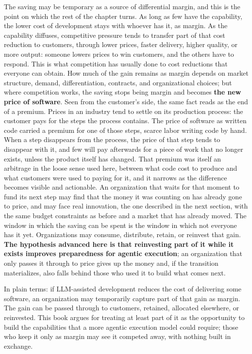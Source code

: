 \documentclass[10pt,oneside,openany]{book}
\newcommand{\keyidea}[1]{%
  \vspace{3pt}
  \noindent\fbox{\begin{minipage}{0.94\linewidth}\small\raggedright\textbf{Key idea.} #1\end{minipage}}
  \vspace{3pt}
}
\renewcommand{\keyidea}[1]{\begin{keyideabox}#1\end{keyideabox}}
\begin{document}
The saving may be temporary as a source of differential margin, and this is the point on which the rest of the chapter turns. As long as few have the capability, the lower cost of development stays with whoever has it, as margin. As the capability diffuses, competitive pressure tends to transfer part of that cost reduction to customers, through lower prices, faster delivery, higher quality, or more output: someone lowers prices to win customers, and the others have to respond. This is what competition has usually done to cost reductions that everyone can obtain. How much of the gain remains as margin depends on market structure, demand, differentiation, contracts, and organizational choices; but where competition works, the saving stops being margin and becomes \textbf{the new price of software}. Seen from the customer's side, the same fact reads as the end of a premium. Prices in an industry tend to settle on its production process: the customer pays for the steps the process contains. The price of software as written code carried a premium for one of those steps, scarce labor writing code by hand. When a step disappears from the process, the price of that step tends to disappear with it, and few will pay afterwards for a piece of work that no longer exists, unless the product itself has changed. That premium was itself an arbitrage in the loose sense used here, between what code cost to produce and what customers were used to paying for it, and it narrows as the difference becomes visible and actionable. An organization that waits for that moment to fund its next step may find that the money it was counting on has already gone to price, and may face real innovation, the one described in the next section, with the same budget constraints as before and a market that has already moved. The window in which the saving can be spent is the window in which not everyone has it yet. Organizations may consume, distribute, retain, or reinvest that gain. \textbf{The hypothesis advanced here is that reinvesting part of it while it exists improves preparedness for agentic execution}; an organization that only passes it through to price gives up the money and, if the transition materializes, also falls behind those who used it to build what comes next.

\keyidea{In plain terms: if LLM-assisted development reduces the cost of delivering some software, an organization may temporarily capture part of that gain as margin. The gain can be passed through to customers, retained, allocated elsewhere, or reinvested. This book argues for treating at least part of it as the opportunity to build the capabilities that a more agentic execution model could require; those who keep it only as margin may see it competed away, with nothing built in exchange.}
\end{document}
